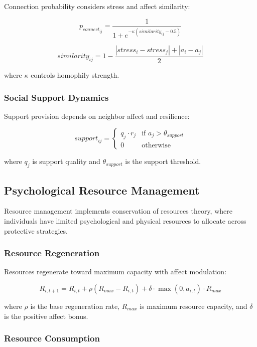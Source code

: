 \documentclass[
  letterpaper,
  DIV=11,
  numbers=noendperiod]{scrartcl}
\begin{document}
Connection probability considers stress and affect similarity:

\[p_{connect_{ij}} = \frac{1}{1 + e^{-\kappa (similarity_{ij} - 0.5)}}\]

\[similarity_{ij} = 1 - \frac{|stress_i - stress_j| + |a_i - a_j|}{2}\]

where \(\kappa\) controls homophily strength.

\subsubsection{Social Support Dynamics}\label{social-support-dynamics}

Support provision depends on neighbor affect and resilience:

\[support_{ij} = \begin{cases}
q_j \cdot r_j & \text{if } a_j > \theta_{support} \\ 0 & \text{otherwise} \end{cases}\]

where \(q_j\) is support quality and \(\theta_{support}\) is the support
threshold.

\subsection{Psychological Resource
Management}\label{psychological-resource-management}

Resource management implements conservation of resources theory, where
individuals have limited psychological and physical resources to
allocate across protective strategies.

\subsubsection{Resource Regeneration}\label{resource-regeneration}

Resources regenerate toward maximum capacity with affect modulation:

\[R_{i,t+1} = R_{i,t} + \rho (R_{max} - R_{i,t}) + \delta \cdot \max(0, a_{i,t}) \cdot R_{max}\]

where \(\rho\) is the base regeneration rate, \(R_{max}\) is maximum
resource capacity, and \(\delta\) is the positive affect bonus.

\subsubsection{Resource Consumption}\label{resource-consumption}
\end{document}
